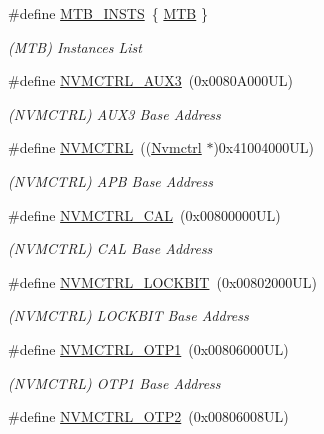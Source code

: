\begin{DoxyCompactItemize}
\#define \mbox{\hyperlink{group___s_a_m_d21_e15_l__base_gafe3245cddfc6d3cb5c9a3f9fa99230fe}{M\+T\+B\+\_\+\+I\+N\+S\+TS}}~\{ \mbox{\hyperlink{group___s_a_m_d21_j18_a__base_ga09636f7f0071f50666d5747d44c6b94e}{M\+TB}} \}
\begin{DoxyCompactList}\small\item\em (M\+TB) Instances List \end{DoxyCompactList}\item 
\#define \mbox{\hyperlink{group___s_a_m_d21_e15_l__base_ga478afec83ff525e3abb7dfb5ca699f18}{N\+V\+M\+C\+T\+R\+L\+\_\+\+A\+U\+X3}}~(0x0080\+A000\+U\+L)
\begin{DoxyCompactList}\small\item\em (N\+V\+M\+C\+T\+RL) A\+U\+X3 Base Address \end{DoxyCompactList}\item 
\#define \mbox{\hyperlink{group___s_a_m_d21_e15_l__base_gad18608913d3d6e423f3a79d84348910a}{N\+V\+M\+C\+T\+RL}}~((\mbox{\hyperlink{struct_nvmctrl}{Nvmctrl}}  $\ast$)0x41004000\+U\+L)
\begin{DoxyCompactList}\small\item\em (N\+V\+M\+C\+T\+RL) A\+PB Base Address \end{DoxyCompactList}\item 
\#define \mbox{\hyperlink{group___s_a_m_d21_e15_l__base_ga0c60c42c3cf35f9e8af5c3228d9e7147}{N\+V\+M\+C\+T\+R\+L\+\_\+\+C\+AL}}~(0x00800000\+U\+L)
\begin{DoxyCompactList}\small\item\em (N\+V\+M\+C\+T\+RL) C\+AL Base Address \end{DoxyCompactList}\item 
\#define \mbox{\hyperlink{group___s_a_m_d21_e15_l__base_gad9901bcc2e9b40d87308e0d1e9557d1a}{N\+V\+M\+C\+T\+R\+L\+\_\+\+L\+O\+C\+K\+B\+IT}}~(0x00802000\+U\+L)
\begin{DoxyCompactList}\small\item\em (N\+V\+M\+C\+T\+RL) L\+O\+C\+K\+B\+IT Base Address \end{DoxyCompactList}\item 
\#define \mbox{\hyperlink{group___s_a_m_d21_e15_l__base_ga6ebf76a96eae94342ff79fce4311baf3}{N\+V\+M\+C\+T\+R\+L\+\_\+\+O\+T\+P1}}~(0x00806000\+U\+L)
\begin{DoxyCompactList}\small\item\em (N\+V\+M\+C\+T\+RL) O\+T\+P1 Base Address \end{DoxyCompactList}\item 
\#define \mbox{\hyperlink{group___s_a_m_d21_e15_l__base_gae182b953c491f84c19d160a97c7d2584}{N\+V\+M\+C\+T\+R\+L\+\_\+\+O\+T\+P2}}~(0x00806008\+U\+L)

\end{DoxyCompactItemize}
